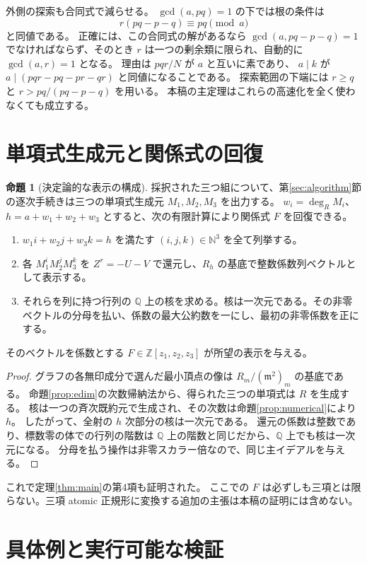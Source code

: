 \documentclass[11pt,a4paper]{ltjsarticle}
\numberwithin{equation}{section}
\theoremstyle{definition}
\newtheorem{proposition}[theorem]{命題}
\newcommand{\Z}{\mathbb Z}\newcommand{\N}{\mathbb N}\newcommand{\Q}{\mathbb Q}\newcommand{\C}{\mathbb C}
\newcommand{\mf}{\mathfrak m}\newcommand{\NF}{\operatorname{NF}}\newcommand{\Frac}{\operatorname{Frac}}\newcommand{\trdeg}{\operatorname{trdeg}}\newcommand{\edim}{\operatorname{edim}}\newcommand{\lcm}{\operatorname{lcm}}\newcommand{\Span}{\operatorname{span}}\newcommand{\Classify}{\operatorname{Classify}}\newcommand{\CheckR}{\operatorname{Check}}\newcommand{\Admissible}{\operatorname{Admissible}}\newcommand{\ord}{\operatorname{ord}}
\begin{document}
外側の探索も合同式で減らせる。
$\gcd(a,pq)=1$ の下では根の条件は
\begin{equation}\label{eq:r-progression}
 r(pq-p-q)\equiv pq\pmod a
\end{equation}
と同値である。
正確には、この合同式の解があるなら $\gcd(a,pq-p-q)=1$ でなければならず、そのとき $r$ は一つの剰余類に限られ、自動的に $\gcd(a,r)=1$ となる。
理由は $pqr/N$ が $a$ と互いに素であり、
$a\mid k$ が $a\mid(pqr-pq-pr-qr)$ と同値になることである。
探索範囲の下端には $r\ge q$ と $r>pq/(pq-p-q)$ を用いる。
本稿の主定理はこれらの高速化を全く使わなくても成立する。

\section{単項式生成元と関係式の回復}\label{sec:relation}
\begin{proposition}[決定論的な表示の構成]\label{prop:relation}
採択された三つ組について、第\ref{sec:algorithm}節の逐次手続きは三つの単項式生成元 $M_1,M_2,M_3$ を出力する。
$w_i=\deg_R M_i$、$h=a+w_1+w_2+w_3$ とすると、次の有限計算により関係式 $F$ を回復できる。
\begin{enumerate}
\item $w_1i+w_2j+w_3k=h$ を満たす $(i,j,k)\in\N^3$ を全て列挙する。
\item 各 $M_1^iM_2^jM_3^k$ を $Z^r=-U-V$ で還元し、$R_h$ の基底で整数係数列ベクトルとして表示する。
\item それらを列に持つ行列の $\Q$ 上の核を求める。核は一次元である。その非零ベクトルの分母を払い、係数の最大公約数を一にし、最初の非零係数を正にする。
\end{enumerate}
そのベクトルを係数とする $F\in\Z[z_1,z_2,z_3]$ が所望の表示を与える。
\end{proposition}
\begin{proof}
グラフの各無印成分で選んだ最小頂点の像は $R_m/(\mf^2)_m$ の基底である。
命題\ref{prop:edim}の次数帰納法から、得られた三つの単項式は $R$ を生成する。
核は一つの斉次既約元で生成され、その次数は命題\ref{prop:numerical}により $h$。
したがって、全射の $h$ 次部分の核は一次元である。
還元の係数は整数であり、標数零の体での行列の階数は $\Q$ 上の階数と同じだから、$\Q$ 上でも核は一次元になる。
分母を払う操作は非零スカラー倍なので、同じ主イデアルを与える。
\end{proof}
これで定理\ref{thm:main}の第4項も証明された。
ここでの $F$ は必ずしも三項とは限らない。三項 atomic 正規形に変換する追加の主張は本稿の証明には含めない。

\section{具体例と実行可能な検証}\label{sec:examples}
\end{document}
